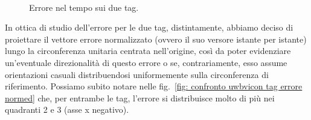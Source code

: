 \begin{figure}[h]
	\centering
	\\
	\caption{Errore nel tempo sui due tag.}
	\label{fig: confronto uwbvicon tag errore tempo}
\end{figure}


In ottica di studio dell'errore per le due tag, distintamente, abbiamo deciso di proiettare il vettore errore normalizzato (ovvero il suo versore istante per istante) lungo la circonferenza unitaria centrata nell'origine, così da poter evidenziare un'eventuale direzionalità di questo errore o se, contrariamente, esso assume orientazioni casuali distribuendosi uniformemente sulla circonferenza di riferimento.
Possiamo subito notare nelle fig.~\ref{fig: confronto uwbvicon tag errore normed} che, per entrambe le tag, l'errore si distribuisce molto di più nei quadranti 2 e 3 (asse x negativo).


